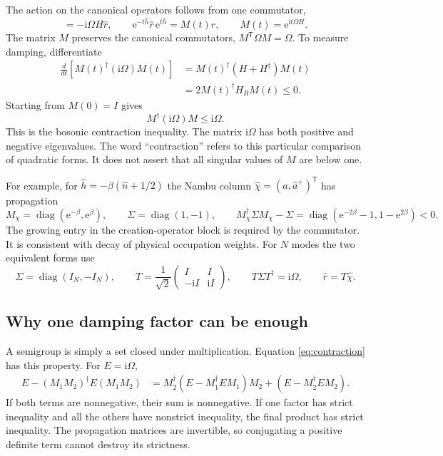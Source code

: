 \documentclass[11pt,a4paper]{article}
\newcommand{\diag}{\operatorname{diag}}
\newcommand{\ee}{\mathrm e}
\newcommand{\ii}{\mathrm i}
\newcommand{\trans}{\mathsf T}
\numberwithin{equation}{section}
\begin{document}
The action on the canonical operators follows from one commutator,
\begin{equation}
 [\hat h,\hat r]=-\ii\Omega H\hat r,
 \qquad
 \ee^{-t\hat h}\hat r\,\ee^{t\hat h}=M(t)\hat r,
 \qquad M(t)=\ee^{\ii t\Omega H}.
 \label{eq:propagation}
\end{equation}
The matrix $M$ preserves the canonical commutators,
$M^\trans\Omega M=\Omega$. To measure damping, differentiate
\begin{align}
 \frac{d}{dt}\left[M(t)^\dagger(\ii\Omega)M(t)\right]
 &=M(t)^\dagger(H+H^\dagger)M(t)\nonumber\\
 &=2M(t)^\dagger H_R M(t)\leq0.
 \label{eq:derivative_contraction}
\end{align}
Starting from $M(0)=I$ gives
\begin{equation}
 \boxed{M^\dagger(\ii\Omega)M\leq\ii\Omega.}
 \label{eq:contraction}
\end{equation}
This is the bosonic contraction inequality. The matrix $\ii\Omega$ has
both positive and negative eigenvalues. The word ``contraction'' refers to
this particular comparison of quadratic forms. It does not assert that all
singular values of $M$ are below one.

For example, for $\hat h=-\beta(\hat n+1/2)$ the Nambu column
$\hat\chi=(\hat a,\hat a^+)^\trans$ has propagation
\begin{equation}
 M_\chi=\diag(\ee^{-\beta},\ee^{\beta}),\qquad
 \Sigma=\diag(1,-1),\qquad
 M_\chi^\dagger\Sigma M_\chi-\Sigma
 =\diag(\ee^{-2\beta}-1,1-\ee^{2\beta})<0.
 \label{eq:oscillator_contraction}
\end{equation}
The growing entry in the creation-operator block is required by the
commutator. It is consistent with decay of physical occupation weights.
For $N$ modes the two equivalent forms use
\begin{equation}
 \Sigma=\diag(I_N,-I_N),\qquad
 T=\frac1{\sqrt2}\begin{pmatrix}I&I\\-\ii I&\ii I\end{pmatrix},
 \qquad T\Sigma T^\dagger=\ii\Omega,
 \qquad \hat r=T\hat\chi.
 \label{eq:metric_dictionary}
\end{equation}

\subsection{Why one damping factor can be enough}

A semigroup is simply a set closed under multiplication. Equation
\eqref{eq:contraction} has this property. For $E=\ii\Omega$,
\begin{align}
 E-(M_1M_2)^\dagger E(M_1M_2)
 &=M_2^\dagger(E-M_1^\dagger EM_1)M_2
   +(E-M_2^\dagger EM_2).
 \label{eq:product_contraction}
\end{align}
If both terms are nonnegative, their sum is nonnegative. If one factor has
strict inequality and all the others have nonstrict inequality, the final
product has strict inequality. The propagation matrices are invertible, so
conjugating a positive definite term cannot destroy its strictness.
\end{document}
